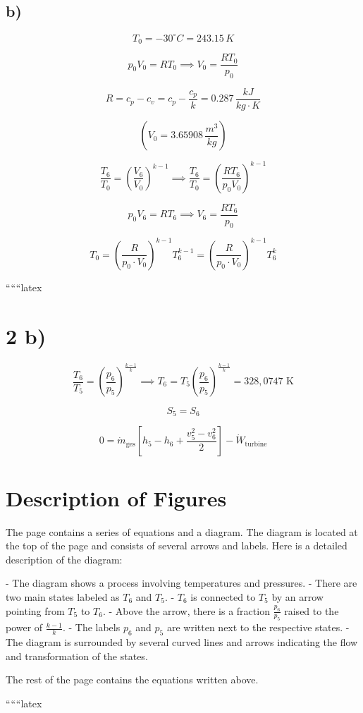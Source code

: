 

\subsection*{b)}

\[
T_0 = -30^\circ C = 243.15 \, K
\]

\[
p_0 V_0 = R T_0 \implies V_0 = \frac{R T_0}{p_0}
\]

\[
R = c_p - c_v = c_p - \frac{c_p}{k} = 0.287 \, \frac{kJ}{kg \cdot K}
\]

\[
\left( V_0 = 3.65908 \, \frac{m^3}{kg} \right)
\]

\[
\frac{T_6}{T_0} = \left( \frac{V_6}{V_0} \right)^{k-1} \implies \frac{T_6}{T_0} = \left( \frac{R T_6}{p_0 V_0} \right)^{k-1}
\]

\[
p_0 V_6 = R T_6 \implies V_6 = \frac{R T_6}{p_0}
\]

\[
T_0 = \left( \frac{R}{p_0 \cdot V_0} \right)^{k-1} T_6^{k-1} = \left( \frac{R}{p_0 \cdot V_0} \right)^{k-1} T_6^{k}
\]

``````latex

\section*{2 b)}

\begin{equation*}
\frac{T_6}{T_5} = \left( \frac{p_6}{p_5} \right)^{\frac{k-1}{k}} \implies T_6 = T_5 \left( \frac{p_6}{p_5} \right)^{\frac{k-1}{k}} = \boxed{328,0747 \text{ K}}
\end{equation*}

\begin{equation*}
S_5 = S_6
\end{equation*}

\begin{equation*}
0 = \dot{m}_{\text{ges}} \left[ h_5 - h_6 + \frac{v_5^2 - v_6^2}{2} \right] - \dot{W}_{\text{turbine}}
\end{equation*}

\section*{Description of Figures}

The page contains a series of equations and a diagram. The diagram is located at the top of the page and consists of several arrows and labels. Here is a detailed description of the diagram:

- The diagram shows a process involving temperatures and pressures.
- There are two main states labeled as \( T_6 \) and \( T_5 \).
- \( T_6 \) is connected to \( T_5 \) by an arrow pointing from \( T_5 \) to \( T_6 \).
- Above the arrow, there is a fraction \(\frac{p_6}{p_5}\) raised to the power of \(\frac{k-1}{k}\).
- The labels \( p_6 \) and \( p_5 \) are written next to the respective states.
- The diagram is surrounded by several curved lines and arrows indicating the flow and transformation of the states.

The rest of the page contains the equations written above.

``````latex
